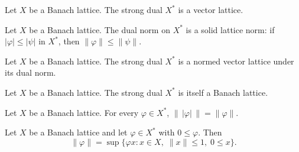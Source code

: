 \begin{theorem}
\label{thm:strongDual-instVectorLattice}
\leanok
{}
Let $X$ be a Banach lattice. The strong dual $X^{*}$ is a vector
lattice.
\end{theorem}

\begin{theorem}
\label{thm:strongDual-instHasSolidNorm}
\leanok
{}
Let $X$ be a Banach lattice. The dual norm on $X^{*}$ is a solid
lattice norm: if $\lvert \varphi \rvert \le \lvert \psi \rvert$
in $X^{*}$, then $\lVert \varphi \rVert \le \lVert \psi \rVert$.
\end{theorem}

\begin{theorem}
\label{thm:strongDual-instNormedVectorLattice}
\leanok
{}
Let $X$ be a Banach lattice. The strong dual $X^{*}$ is a normed
vector lattice under its dual norm.
\end{theorem}

\begin{theorem}
\label{thm:strongDual-instBanachLattice}
\leanok
{}
Let $X$ be a Banach lattice. The strong dual $X^{*}$ is itself a
Banach lattice.
\end{theorem}

\begin{theorem}
\label{thm:strongDual-norm-abs}
\leanok
{}
Let $X$ be a Banach lattice. For every $\varphi \in X^{*}$,
$\lVert \, \lvert \varphi \rvert \, \rVert = \lVert \varphi
\rVert$.
\end{theorem}

\begin{theorem}
\label{thm:strongDual-norm-of-nonneg}
\leanok
{}
Let $X$ be a Banach lattice and let $\varphi \in X^{*}$ with
$0 \le \varphi$. Then
\[
  \lVert \varphi \rVert
  = \sup \{ \varphi x : x \in X, \; \lVert x \rVert \le 1, \;
    0 \le x \}.
\]
\end{theorem}

